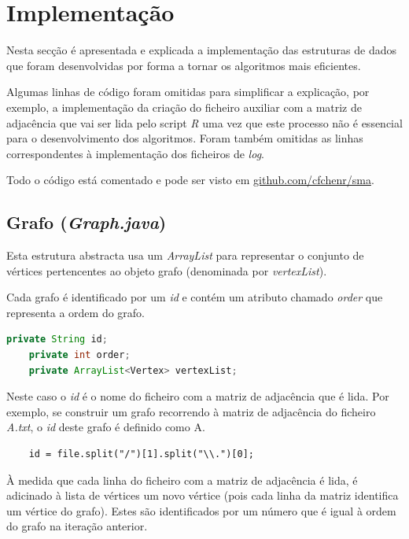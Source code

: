 \documentclass[a4paper,10pt]{report}
\begin{document}
\chapter{Implementação}

Nesta secção é apresentada e explicada a implementação das estruturas de dados que foram desenvolvidas por forma a tornar os algoritmos mais eficientes.

Algumas linhas de código foram omitidas para simplificar a explicação, por exemplo, a implementação da criação do ficheiro auxiliar com a matriz de adjacência que vai ser lida pelo script \textit{R} uma vez que este processo não é essencial para o desenvolvimento dos algoritmos.
Foram também omitidas as linhas correspondentes à implementação dos ficheiros de \textit{log}.

Todo o código está comentado e pode ser visto em  \href{https://github.com/cfchenr/sma}{github.com/cfchenr/sma}.

\section{Grafo (\textit{Graph.java})}

Esta estrutura abstracta usa um \textit{ArrayList} para representar o conjunto de vértices pertencentes ao objeto grafo (denominada por \textit{vertexList}).

Cada grafo é identificado por um \textit{id} e contém um atributo chamado \textit{order} que representa a ordem do grafo.

\begin{lstlisting}[language=Java]
    private String id;
    private int order;
    private ArrayList<Vertex> vertexList;
\end{lstlisting}

Neste caso o \textit{id} é o nome do ficheiro com a matriz de adjacência que é lida. Por exemplo, se construir um grafo recorrendo à matriz de adjacência do ficheiro \textit{A.txt}, o \textit{id} deste grafo é definido como A.

\begin{lstlisting}
    id = file.split("/")[1].split("\\.")[0];
\end{lstlisting}

À medida que cada linha do ficheiro com a matriz de adjacência é lida, é adicinado à lista de vértices um novo vértice (pois cada linha da matriz identifica um vértice do grafo). Estes são identificados por um número que é igual à ordem do grafo na iteração anterior.
\end{document}
